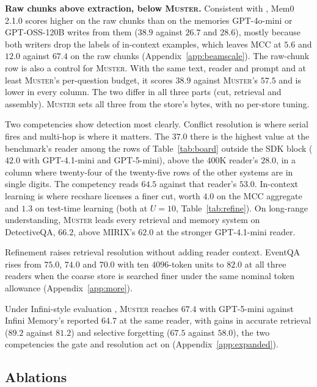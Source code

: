 \documentclass{article}
\newcommand{\sys}{\textsc{Muster}}
\newcommand{\serial}{\textsf{serial}}
\newcommand{\cov}{\textsf{recshare}}
\begin{document}
\textbf{Raw chunks above extraction, below \sys{}.} Consistent with \cite{fidelity}, Mem0 2.1.0 scores higher on the raw chunks than on the memories GPT-4o-mini or GPT-OSS-120B writes from them ($38.9$ against $26.7$ and $28.6$), mostly because both writers drop the labels of in-context examples, which leaves MCC at $5.6$ and $12.0$ against $67.4$ on the raw chunks (Appendix~\ref{app:beamscale}). The raw-chunk row is also a control for \sys{}. With the same text, reader and prompt and at least \sys{}'s per-question budget, it scores $38.9$ against \sys{}'s $57.5$ and is lower in every column. The two differ in all three parts (cut, retrieval and assembly). \sys{} sets all three from the store's bytes, with no per-store tuning.

Two competencies show detection most clearly. Conflict resolution is where \serial{} fires and
multi-hop is where it matters. The $37.0$ there is the highest value at the benchmark's reader among the rows of Table~\ref{tab:board} outside the SDK block ($42.0$ with GPT-4.1-mini and GPT-5-mini), above the
$400$K reader's $28.0$, in a column where twenty-four of the twenty-five rows of the other systems are in single digits.
The competency reads $64.5$ against that reader's $53.0$.
In-context learning is where \cov{} licenses a finer cut, worth $4.0$ on the MCC aggregate and $1.3$ on test-time learning (both at $U=10$, Table~\ref{tab:refine}). On long-range understanding, \sys{} leads every retrieval and memory system on DetectiveQA, $66.2$, above MIRIX's $62.0$ at the stronger GPT-4.1-mini reader.

Refinement raises retrieval resolution without adding reader context. EventQA rises from $75.0$, $74.0$ and $70.0$ with ten $4096$-token units to $82.0$ at all three readers when the coarse store is searched finer under the same nominal token allowance (Appendix~\ref{app:more}).

Under Infini-style evaluation \cite{infini}, \sys{} reaches $67.4$ with GPT-5-mini against Infini Memory's reported $64.7$ at the same reader, with gains in accurate retrieval ($89.2$ against $81.2$) and selective forgetting ($67.5$ against $58.0$), the two competencies the gate and resolution act on (Appendix~\ref{app:expanded}).

\subsection{Ablations}\label{sec:ablations}
\end{document}
